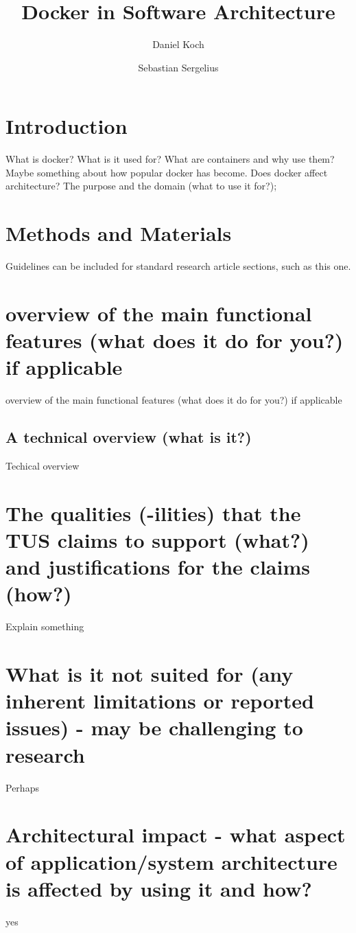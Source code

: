\documentclass[fleqn,10pt]{olplainarticle}
\title{Docker in Software Architecture}
\author[1]{Daniel Koch}
\author[2]{Sebastian Sergelius}
\affil[1]{Address of first author}
\affil[2]{Address of second author}
\begin{document}
\flushbottom
\maketitle
\thispagestyle{empty}

\section*{Introduction}

What is docker? What is it used for? What are containers and why use them? Maybe something about how popular docker has become. Does docker affect architecture?
The purpose and the domain (what to use it for?);

\section*{Methods and Materials}

Guidelines can be included for standard research article sections, such as this one.

\section*{ overview of the main functional features (what does it do for you?) if applicable}
\label{sec:examples}
 overview of the main functional features (what does it do for you?) if applicable

\subsection*{A technical overview (what is it?) }

Techical overview

\section*{The qualities (-ilities) that the TUS claims to support (what?) and justifications for the claims (how?)}

Explain something

\section*{What is it not suited for (any inherent limitations or reported issues) - may be challenging to research}

Perhaps

\section*{Architectural impact - what aspect of application/system architecture is affected by using it and how?}
yes
\end{document}
